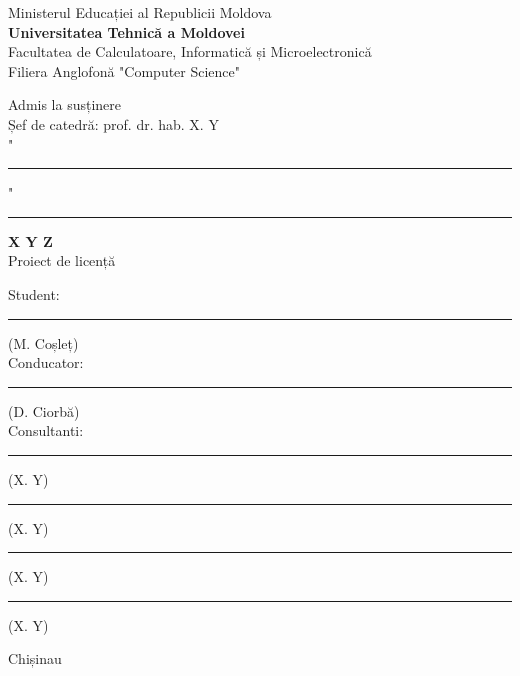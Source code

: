 \begin{titlepage}

\newcommand{\HRule}{\rule{\linewidth}{0.5mm}}

\center

Ministerul Educației al Republicii Moldova\\
\textbf{Universitatea Tehnică a Moldovei}\\
Facultatea de Calculatoare, Informatică și Microelectronică\\
Filiera Anglofonă "Computer Science"\\


\vspace{2cm}

\hfill Admis la susținere\\
\hfill Șef de catedră: prof. dr. hab. X. Y\\

\vspace{0.4cm}
\hfill "\rule{0.75cm}{0.2mm}" \ \rule{3cm}{0.2mm} \the\year
\vspace{3cm}


\begin{center}
\Large \textbf{X Y Z}\\
\vspace{0.6cm}
Proiect de licență
\end{center}
\vspace{1cm}


\hfill Student: \rule{3.9cm}{0.2mm}(M. Coșleț)\\
\vspace{0.2cm}
\hfill Conducator: \rule{4cm}{0.2mm}(D. Ciorbă)\\
\vspace{0.2cm}
\hfill Consultanti: \rule{4.2cm}{0.2mm}(X. Y)\\
\vspace{0.2cm}
\hfill \rule{4cm}{0.2mm}(X. Y)\\
\vspace{0.2cm}
\hfill \rule{3.9cm}{0.2mm}(X. Y)\\
\vspace{0.2cm}
\hfill \rule{4cm}{0.2mm}(X. Y)\\
\vspace{4cm}


\begin{center}
Chișinau \the\year
\end{center}

\vfill 

\end{titlepage}
